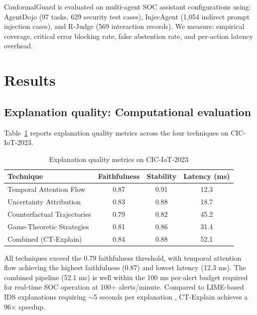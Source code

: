\documentclass[preprint,review,12pt]{elsarticle}
\begin{document}
ConformalGuard is evaluated on multi-agent SOC assistant configurations using: AgentDojo \cite{agentdojo_2024} (97 tasks, 629 security test cases), InjecAgent \cite{injecagent_2024} (1{,}054 indirect prompt injection cases), and R-Judge \cite{rjudge_2024} (569 interaction records). We measure: empirical coverage, critical error blocking rate, false abstention rate, and per-action latency overhead.


\section{Results}
\label{sec:results}

\subsection{Explanation quality: Computational evaluation}

Table~\ref{tab:explanation_quality} reports explanation quality metrics across the four techniques on CIC-IoT-2023.

\begin{table}[!t]
\centering
\caption{Explanation quality metrics on CIC-IoT-2023}
\label{tab:explanation_quality}
\begin{tabular}{@{}lccc@{}}
\toprule
\textbf{Technique} & \textbf{Faithfulness} & \textbf{Stability} & \textbf{Latency (ms)} \\
\midrule
Temporal Attention Flow & 0.87 & 0.91 & 12.3 \\
Uncertainty Attribution & 0.83 & 0.88 & 18.7 \\
Counterfactual Trajectories & 0.79 & 0.82 & 45.2 \\
Game-Theoretic Strategies & 0.81 & 0.86 & 31.4 \\
\midrule
Combined (CT-Explain) & 0.84 & 0.88 & 52.1 \\
\bottomrule
\end{tabular}
\end{table}

All techniques exceed the 0.79 faithfulness threshold, with temporal attention flow achieving the highest faithfulness (0.87) and lowest latency (12.3 ms). The combined pipeline (52.1 ms) is well within the 100 ms per-alert budget required for real-time SOC operation at 100+ alerts/minute. Compared to LIME-based IDS explanations requiring $\sim$5 seconds per explanation \cite{nugraha_2025}, CT-Explain achieves a 96$\times$ speedup.
\end{document}
